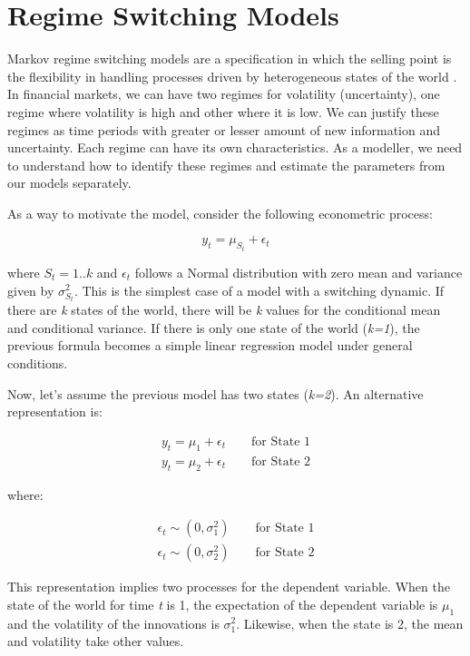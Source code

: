 \documentclass[11pt,]{book}
\begin{document}
\section{Regime Switching Models}\label{regime-switching-models}

Markov regime switching models are a specification in which the selling
point is the flexibility in handling processes driven by heterogeneous
states of the world \citep{hamilton:1994}. In financial markets, we can
have two regimes for volatility (uncertainty), one regime where
volatility is high and other where it is low. We can justify these
regimes as time periods with greater or lesser amount of new information
and uncertainty. Each regime can have its own characteristics. As a
modeller, we need to understand how to identify these regimes and
estimate the parameters from our models separately.

As a way to motivate the model, consider the following econometric
process:

\[ y_t=\mu_{S_t} + \epsilon_t \]

where \(S_t=1..k\) and \(\epsilon_t\) follows a Normal distribution with
zero mean and variance given by \(\sigma^2_{S_t}\). This is the simplest
case of a model with a switching dynamic. If there are \emph{k} states
of the world, there will be \emph{k} values for the conditional mean and
conditional variance. If there is only one state of the world
(\emph{k=1}), the previous formula becomes a simple linear regression
model under general conditions.

Now, let's assume the previous model has two states (\emph{k=2}). An
alternative representation is:

\begin{eqnarray*}
y_t=\mu_{1} + \epsilon_t \qquad \mbox{for State 1} \\
y_t=\mu_{2} + \epsilon_t \qquad \mbox{for State 2} 
\end{eqnarray*}

where:

\begin{eqnarray*}
\epsilon_t \sim (0,\sigma^2_{1}) \qquad \mbox{for State 1} \\
\epsilon_t \sim (0,\sigma^2_{2}) \qquad \mbox{for State 2} 
\end{eqnarray*}

This representation implies two processes for the dependent variable.
When the state of the world for time \emph{t} is 1, the expectation of
the dependent variable is \(\mu_1\) and the volatility of the
innovations is \(\sigma^2_1\). Likewise, when the state is 2, the mean
and volatility take other values.
\end{document}

